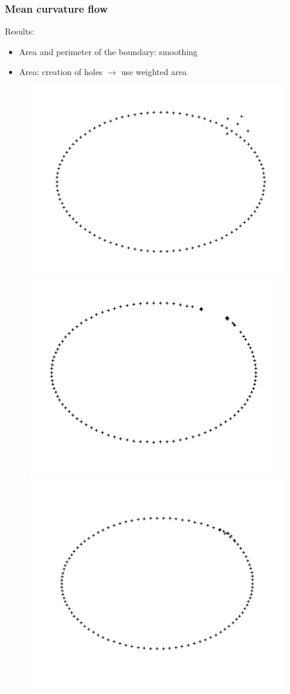 \documentclass{beamer}
\begin{document}
\begin{frame}
    \frametitle{Mean curvature flow}

    Results:
    \begin{itemize}
        \item Area and perimeter of the boundary: smoothing
        \item Area: creation of holes $ \to $ use weighted area
    \end{itemize}

    \begin{figure}
        \centering
        \includegraphics[scale=0.22]{img/ellipse-outliers}
        \includegraphics[scale=0.22]{img/ellipse-outliers-area}
        \includegraphics[scale=0.22]{img/ellipse-outliers-perimeter}

\end{figure}
\end{frame}
\end{document}

